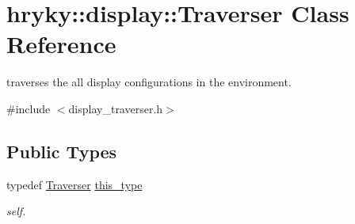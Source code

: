 \hypertarget{classhryky_1_1display_1_1_traverser}{\section{hryky\-:\-:display\-:\-:Traverser Class Reference}
\label{classhryky_1_1display_1_1_traverser}
}


traverses the all display configurations in the environment.  




{\ttfamily \#include $<$display\-\_\-traverser.\-h$>$}

\subsection*{Public Types}
\begin{DoxyCompactItemize}
\item 
\hypertarget{classhryky_1_1display_1_1_traverser_a96d51504370e112d234076449e2fec47}{typedef \hyperlink{classhryky_1_1display_1_1_traverser}{Traverser} \hyperlink{classhryky_1_1display_1_1_traverser_a96d51504370e112d234076449e2fec47}{this\-\_\-type}}\label{classhryky_1_1display_1_1_traverser_a96d51504370e112d234076449e2fec47}

\begin{DoxyCompactList}\small\item\em self. \end{DoxyCompactList}\end{DoxyCompactItemize}
